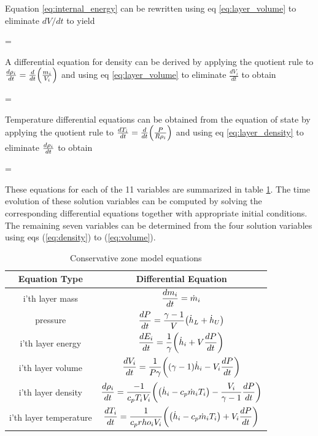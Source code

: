 Equation \ref{eq:internal_energy} can be rewritten using eq \ref{eq:layer_volume} to eliminate $dV/dt$ to yield

\be {} =   \ee

A differential equation for density can be derived by applying the quotient rule to $\frac{d \rho_i}{dt} = \frac{d}{dt} { \left( {\frac{m_i}{V_i}} \right) }$ and using eq \ref{eq:layer_volume} to eliminate $\frac{dV_i}{dt}$ to obtain

\be {} =   \label{eq:layer_density}\ee

Temperature differential equations can be obtained from the equation of state by applying the quotient rule to $\frac{d {T_i}}{dt} = \frac{d {}}{dt} { \left( {\frac{P}{R \rho_i}} \right) }$ and using eq \ref{eq:layer_density} to eliminate $\frac{d {\rho_i}}{dt}$ to obtain

\be {} =   \ee

These equations for each of the 11 variables are summarized in table \ref{tab:zone_model_equations}. The time evolution of
these solution variables can be computed by solving the corresponding differential equations
together with appropriate initial conditions. The remaining seven variables can be determined
from the four solution variables using eqs (\ref{eq:density}) to (\ref{eq:volume}).

\begin{table}
\begin{center}
\caption{Conservative zone model equations}
\label{tab:zone_model_equations}
\vspace{0.1in}
\begin{tabular}{|c|c|}
\hline
Equation Type & Differential Equation \\ \hline
i'th layer mass & $\displaystyle {\frac{d {m_i}}{dt} = \dot m_i}$ \\ \hline
pressure & $\displaystyle {\frac{d {P}}{dt} = \frac{{\gamma -1}}{{V}}  { \left( {\dot h_L + \dot h_U} \right) } }$ \\ \hline
i'th layer energy & $\displaystyle {\frac{d {E_i}}{dt} = \frac{1}{\gamma}  { \left( {\dot h_i + V \frac{d {P}}{dt}} \right) } }$ \\ \hline
i'th layer volume & $\displaystyle {\frac{d {V_i}}{dt} = \frac{1}{P \gamma}  { \left( { { \left( {\gamma -1} \right) }  \dot h_i - V_i \frac{d {P}}{dt}} \right) }  }$ \\ \hline
i'th layer density & $\displaystyle {\frac{d {\rho_i}}{dt} = \frac{-1}{c_p T_i V_i}  { \left( { { \left( {\dot h_i - c_p \dot m_i T_i} \right) }  - \frac{V_i}{\gamma - 1}\frac{d {P}}{dt}} \right) } }$ \\ \hline
i'th layer temperature & $\displaystyle {\frac{d {T_i}}{dt} = \frac{1}{c_p rho_i V_i}  { \left( { { \left( {\dot h_i - c_p \dot m_i T_i} \right) } + V_i \frac{d {P}}{dt}} \right) } }$ \\ \hline
\end{tabular}  
\end{center}
\end{table}

